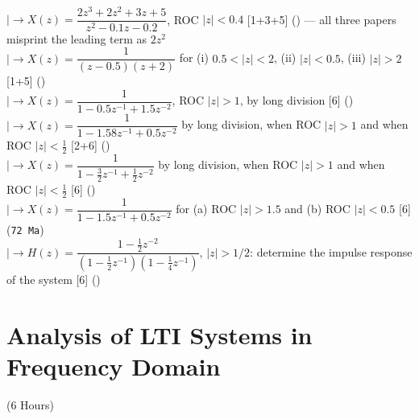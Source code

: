 \documentclass[12pt]{article}
\newcommand{\lb}{\\$\left|\rightarrow\right.$}
\begin{document}
\begin{enumerate}[topsep=0pt, noitemsep]
        \lb $X(z)=\dfrac{2z^3+2z^2+3z+5}{z^2-0.1z-0.2}$, ROC $|z|<0.4$ \hfill [1+3+5] () --- all three papers misprint the leading term as $2z^2$
        \lb $X(z)=\dfrac{1}{(z-0.5)(z+2)}$ for (i) $0.5<|z|<2$, (ii) $|z|<0.5$, (iii) $|z|>2$ \hfill [1+5] ()
        \lb $X(z)=\dfrac{1}{1-0.5z^{-1}+1.5z^{-2}}$, ROC $|z|>1$, by long division \hfill [6] ()
        \lb $X(z)=\dfrac{1}{1-1.58z^{-1}+0.5z^{-2}}$ by long division, when ROC $|z|>1$ and when ROC $|z|<\tfrac12$ \hfill [2+6] ()
        \lb $X(z)=\dfrac{1}{1-\tfrac32 z^{-1}+\tfrac12 z^{-2}}$ by long division, when ROC $|z|>1$ and when ROC $|z|<\tfrac12$ \hfill [6] ()
        \lb $X(z)=\dfrac{1}{1-1.5z^{-1}+0.5z^{-2}}$ for (a) ROC $|z|>1.5$ and (b) ROC $|z|<0.5$ \hfill [6] (\texttt{72 Ma})
        \lb $H(z)=\dfrac{1-\tfrac12 z^{-2}}{(1-\tfrac12 z^{-1})(1-\tfrac14 z^{-1})}$, $|z|>1/2$: determine the impulse response of the system \hfill [6] ()
    \end{enumerate}

\pagebreak
\section{Analysis of LTI Systems in Frequency Domain}
\begin{center}(6 Hours)\end{center}
\end{document}
